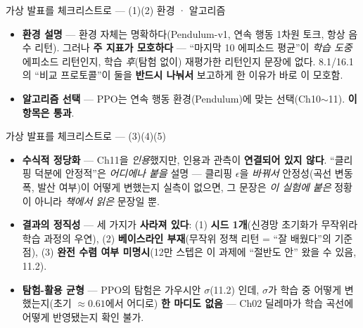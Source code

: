 \documentclass[aspectratio=169,11pt]{beamer}
\begin{document}
\begin{frame}{가상 발표를 체크리스트로 — (1)(2) 환경 · 알고리즘}
  \small
  \begin{itemize}
    \item \textbf{환경 설명} — 환경 자체는 명확하다(Pendulum-v1, 연속
      행동 1차원 토크, 항상 음수 리턴). 그러나 \textbf{주 지표가
      모호하다} — ``마지막 10 에피소드 평균''이 \emph{학습 도중} 에피소드
      리턴인지, 학습 \emph{후}(탐험 없이) 재평가한 리턴인지 문장에
      없다. 8.1/16.1의 ``비교 프로토콜''이 둘을 \textbf{반드시
      나눠서} 보고하게 한 이유가 바로 이 모호함.
    \item \textbf{알고리즘 선택} — PPO는 연속 행동 환경(Pendulum)에
      맞는 선택(Ch10$\sim$11). \textbf{이 항목은 통과}.
  \end{itemize}
\end{frame}

\begin{frame}{가상 발표를 체크리스트로 — (3)(4)(5)}
  \small
  \begin{itemize}
    \item \textbf{수식적 정당화} — Ch11을 \emph{인용}했지만, 인용과
      관측이 \textbf{연결되어 있지 않다}. ``클리핑 덕분에 안정적''은
      \emph{어디에나 붙을} 설명 — 클리핑 $\epsilon$을 \emph{바꿔서}
      안정성(곡선 변동폭, 발산 여부)이 어떻게 변했는지 실측이 없으면,
      그 문장은 \emph{이 실험에 붙은} 정황이 아니라 \emph{책에서 읽은}
      문장일 뿐.
    \item \textbf{결과의 정직성} — 세 가지가 \textbf{사라져 있다}:
      (1) \textbf{시드 1개}(신경망 초기화가 무작위라 학습 과정의
      우연), (2) \textbf{베이스라인 부재}(무작위 정책 리턴 = ``잘
      배웠다''의 기준점), (3) \textbf{완전 수렴 여부 미명시}(12만
      스텝은 이 과제에 ``절반도 안'' 왔을 수 있음, 11.2).
    \item \textbf{탐험-활용 균형} — PPO의 탐험은 가우시안 $\sigma$(11.2)
     인데, $\sigma$가 학습 중 어떻게 변했는지(초기 $\approx 0.61$에서
      어디로) \textbf{한 마디도 없음} — Ch02 딜레마가 학습 곡선에
      어떻게 반영됐는지 확인 불가.
  \end{itemize}
\end{frame}

\end{document}
